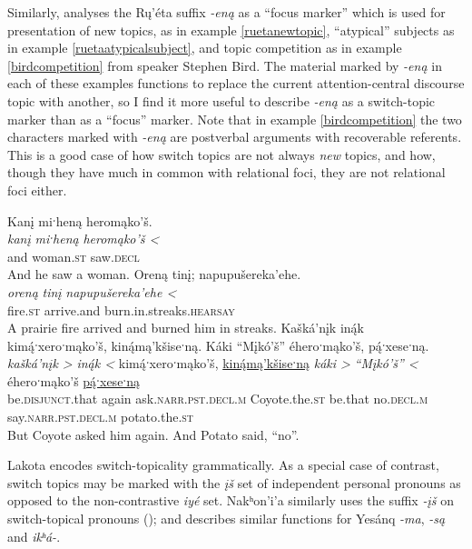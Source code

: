 \documentclass[output=paper]{LSP/langsci}
\begin{document}
	Similarly, \citet{Wolvengrey1991} analyses the Rų’éta suffix \emph{-eną} as a “focus marker” which is used for presentation of new topics, as in example \ref{ruetanewtopic}, “atypical” subjects as in example \ref{ruetaatypicalsubject}, and topic competition as in example \ref{birdcompetition} from speaker Stephen Bird. The material marked by \emph{-eną} in each of these examples functions to replace the current attention-central discourse topic with another, so I find it more useful to describe \emph{-eną} as a switch-topic marker than as a “focus” marker. Note that in example \ref{birdcompetition} the two characters marked with \emph{-eną} are postverbal arguments with recoverable referents. This is a good case of how switch topics are not always \emph{new} topics, and how, though they have much in common with relational foci, they are not relational foci either.

\ea\label{ruetaswitchtopic}
\ea\label{ruetanewtopic}
Kanį miˑheną heromąko’š.\footnotemark\\
\gll 	\emph{kanį}	 	\emph{miˑheną} 	\emph{heromąko’š <}\\
	and 			woman.\textsc{st} 	saw.\textsc{decl}\\
\glt	And he saw a woman.
\ex\label{ruetaatypicalsubject}
Oreną tinį; napupušereka’ehe.\footnotemark\\
\gll 	\emph{oreną}	\emph{tinį}	\emph{napupušereka’ehe <}\\
	fire.\textsc{st} 	arrive.and 	burn.in.streaks.\textsc{hearsay}\\
\glt	A prairie fire arrived and burned him in streaks.
\ex\label{birdcompetition}
Kašká’nįk in\'{ą}k kim\'{ą}ˑxeroˑmąko’š, kin\'{ą}mą’kšiseˑną. Káki “Mįkó’š” éheroˑmąko’š, p\'{ą}ˑxeseˑną.\footnotemark\\
\gll 	\emph{kašká’nįk >}		\emph{in\'{ą}k <} 	kim\'{ą}ˑxeroˑmąko’š, 		\underline{kin\'{ą}mą’kšiseˑną}	\emph{káki >}	\emph{“Mįkó’š” <}			éheroˑmąko’š 			\underline{p\'{ą}ˑxeseˑną}\\
	be.\textsc{disjunct}.that 	again 			ask.\textsc{narr.pst.decl.m} 	Coyote.the.\textsc{st}		be.that 		no.\textsc{decl.m} 					say.\textsc{narr.pst.decl.m} 	potato.the.\textsc{st}\\
\glt	But Coyote asked him again. And Potato said, “no”.
\z\z

	Lakota encodes switch-topicality grammatically. As a special case of contrast, switch topics may be marked with the \emph{įš} set of independent personal pronouns as opposed to the non-contrastive \emph{iyé} set. Nakʰon’i’a similarly uses the suffix \emph{-įš} on switch-topical pronouns (\citealt[129--130]{Cumberland2005}); and \citealt[149]{Oliverio1996} describes similar functions for Yesánq \emph{-ma}, \emph{-są} and \emph{ikʰá-}. 
	
\end{document}
